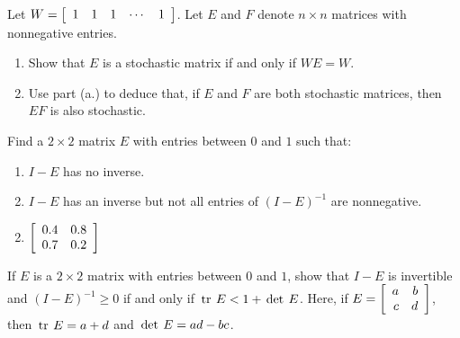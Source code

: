 \begin{multicols}{2}
\begin{ex}
Let $W = \left[ \begin{array}{ccccc}
1 & 1 & 1 & \cdots & 1
\end{array} \right]$. Let $E$ and $F$ denote $n \times n$ matrices with nonnegative entries.

\begin{enumerate}[label={\alph*.}]
\item Show that $E$ is a stochastic matrix if and only if $WE = W$.

\item Use part (a.) to deduce that, if $E$ and $F$ are both stochastic matrices, then $EF$ is also stochastic.

\end{enumerate}
\end{ex}

\begin{ex}
Find a $2 \times 2$ matrix $E$ with entries between $0$ and $1$ such that:

\begin{enumerate}[label={\alph*.}]
\item $I - E$ has no inverse.

\item $I - E$ has an inverse but not all entries of $(I - E)^{-1}$ are nonnegative.

\end{enumerate}
\begin{sol}
\begin{enumerate}[label={\alph*.}]
\setcounter{enumi}{1}
\item $\left[ \begin{array}{rr}
0.4 & 0.8 \\
0.7 & 0.2
\end{array} \right]$

\end{enumerate}
\end{sol}
\end{ex}

\begin{ex}
If $E$ is a $2 \times 2$ matrix with entries between $0$ and $1$, show that $I - E$ is invertible and $(I - E)^{-1} \geq 0$ if and only if $\thinspace\operatorname{tr \medspace}E < 1 + \thinspace\operatorname{det \medspace}E$. Here, if $E = \left[ \begin{array}{rr}
a & b \\
c & d
\end{array} \right]$,
 then $\thinspace\operatorname{tr \medspace}E = a + d$ and $\thinspace\operatorname{det \medspace}E = ad - bc$.


\end{ex}
\end{multicols}
